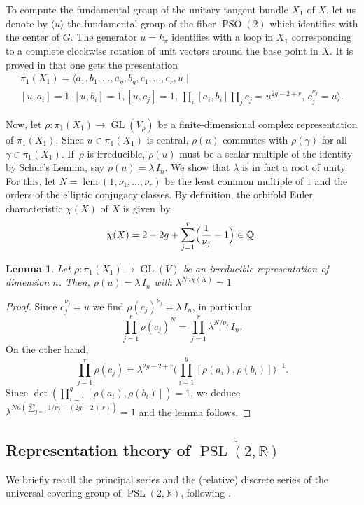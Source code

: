 \documentclass[10pt]{amsart}
\theoremstyle{plain}
\newtheorem{lem}[thm]{Lemma}
\theoremstyle{definition}
\theoremstyle{remark}
\newcommand{\R}{\mathbb{R}}
\newcommand{\Q}{\mathbb{Q}}
\DeclareMathOperator{\PSL}{PSL}
\DeclareMathOperator{\GL}{GL}
\DeclareMathOperator{\PSO}{PSO}
\numberwithin{equation}{section}
\begin{document}
To compute the fundamental group of the unitary tangent bundle $X_1$ of $X$, let us denote by $\langle u\rangle$ the fundamental group of the fiber $\PSO(2)$ which identifies with the center of $\widetilde{G}$. The generator $u=\widetilde{k}_\pi$ identifies with a loop in $X_1$ corresponding to a complete clockwise rotation of unit vectors around the base point in $X$. It is proved in \cite[\S 2]{fried1986fuchsian} that one gets the presentation
\begin{multline}\label{presentation}
\textstyle
\pi_1(X_1) = \bigl\langle a_1, b_1, \ldots, a_g, b_g, c_1, \ldots, c_r, u \mid \\ [u,a_i] =1, [u,b_i]=1, [u,c_j]=1, \, \prod_i[a_i,b_i]\prod_j c_j = u^{2g-2+r}, \, c_j^{\nu_j}=u \bigr\rangle.
\end{multline}

Now, let $\rho:\pi_1(X_1)\to\GL(V_\rho)$ be a finite-dimensional complex representation of $\pi_1(X_1)$. Since $u\in\pi_1(X_1)$ is central, $\rho(u)$ commutes with $\rho(\gamma)$ for all $\gamma\in\pi_1(X_1)$. If~$\rho$ is irreducible, $\rho(u)$ must be a scalar multiple of the identity by Schur's Lemma, say $\rho(u)=\lambda\,I_n$. We show that $\lambda$ is in fact a root of unity. For this, let $N = \operatorname{lcm}(1, \nu_1, \ldots, \nu_r)$ be the least common multiple of $1$ and the orders of the elliptic conjugacy classes. By definition, the orbifold Euler characteristic $\chi(X)$ of $X$ is given~by
\[
\chi(X) = 2-2g+\sum_{j=1}^r\Bigl(\frac 1 {\nu_j}-1\Bigr) \in \Q.
\]

\begin{lem}\label{lem:CenterActionIrredPi1X1}
Let $\rho\colon \pi_1(X_1) \to \GL(V)$ be an irreducible representation of dimension $n$. Then, $\rho(u) =\lambda\, I_n$ with $\lambda^{Nn\chi(X)}=1$
\end{lem}

\begin{proof}
Since $c_j^{\nu_j}=u$ we find
$\rho(c_j)^{\nu_j}= \lambda \, I_n$, in particular
\[
\prod_{j=1}^r \rho(c_j)^N = \prod_{j=1}^r \lambda ^{N/\nu_j} \, I_n.
\]
On the other hand,
\[
\prod_{j=1}^r \rho(c_j) = \lambda^{2g-2+r} \biggl(\prod_{i=1}^g[\rho(a_i),\rho(b_i)]\biggr)^{-1}.
\]
Since $\det(\prod_{i=1}^g[\rho(a_i),\rho(b_i)]) = 1$, we deduce
$\lambda^{Nn \left(\sum_{j=1}^r 1/\nu_j - (2g-2+r)\right)} = 1$
and the lemma follows.
\end{proof}

\subsection{Representation theory of $\widetilde{\PSL(2,\R)}$}
\label{subsec:RepTheory}
We briefly recall the principal series and the (relative) discrete series of the universal covering group of $\PSL(2,\R)$, following \cite[\S 1]{Hof94}.
\end{document}
